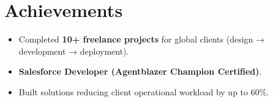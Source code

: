 \documentclass[letterpaper,11pt]{article}
\newcommand{\achievementItem}[1]{\item\small{#1 \vspace{-6pt}}}
\begin{document}
\section{Achievements}
\begin{itemize}[leftmargin=0.15in]
  \achievementItem{Completed \textbf{10+ freelance projects} for global clients (design → development → deployment).}
  \achievementItem{\textbf{Salesforce Developer (Agentblazer Champion Certified)}.}
  \achievementItem{Built solutions reducing client operational workload by up to 60\%.}
\end{itemize}
\end{document}
